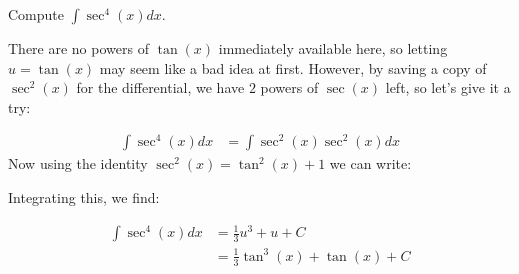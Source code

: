 \documentclass{ximera}
\begin{document}
\begin{example}
Compute $\int \sec^{4}(x) dx$. 

\begin{explanation}
 There are no powers of $\tan(x)$ immediately available here, so letting $u=\tan(x)$ may seem like a bad idea at first.  However, by saving a copy of $\sec^2(x)$ for the differential, we have $2$ powers of $\sec(x)$ left, so let's give it a try:
 
    \begin{align*}
    \int \sec^{4}(x) dx  &= \int \sec^2(x) \sec^2(x) dx
    \end{align*}
    Now using the identity $\sec^{2}(x)=\tan^{2}(x)+1$ we can write:
    \begin{center}%
    \end{center}
   
   Integrating this, we find:
   
   \begin{align*}
   \int \sec^{4}(x) dx  &= \frac{1}{3}u^3+u +C\\
   &= \frac{1}{3} \tan^3(x)+\tan(x)+C
   \end{align*}
\end{explanation}
\end{example} 
\end{document}
